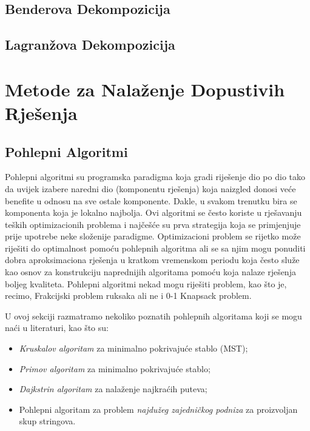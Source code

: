 \documentclass[a4paper, utf8, 11pt, colorlinks]{article}
\begin{document}
 
 
 \subsection{Benderova Dekompozicija}
 
  \subsection{Lagranžova Dekompozicija}
 
 \section{Metode za Nalaženje Dopustivih Rješenja}

\subsection{Pohlepni Algoritmi}
 
Pohlepni algoritmi su programska paradigma koja gradi riješenje dio po dio tako da 
uvijek izabere naredni dio (komponentu rješenja) koja naizgled donosi veće benefite u odnosu na sve ostale komponente. Dakle, u svakom trenutku bira se komponenta koja je lokalno najbolja.  Ovi algoritmi se često koriste u rješavanju teških optimizacionih problema i najčešće su prva strategija koja se primjenjuje prije 
upotrebe neke složenije paradigme. Optimizacioni problem se rijetko može riješiti do optimalnost pomoću pohlepnih algoritma ali se sa njim mogu ponuditi dobra aproksimaciona rješenja u kratkom vremenskom periodu koja često služe kao osnov za konstrukciju naprednijih algoritama pomoću koja nalaze  rješenja boljeg kvaliteta. Pohlepni algoritmi nekad mogu riješiti problem, kao što je, recimo, Frakcijski problem ruksaka ali ne i 0-1 Knapsack problem. 

U ovoj sekciji razmatramo nekoliko poznatih pohlepnih algoritama koji se mogu naći u literaturi, kao što su:
\begin{itemize}
	\item  \emph{Kruskalov algoritam} za minimalno pokrivajuće stablo (MST);
	\item  \emph{Primov algoritam} za minimalno pokrivajuće stablo;
	\item  \emph{Dajkstrin algoritam} za nalaženje najkraćih puteva;
	\item  Pohlepni algoritam za problem \emph{najdužeg zajedničkog podniza} za proizvoljan skup stringova.
\end{itemize}
\end{document}
